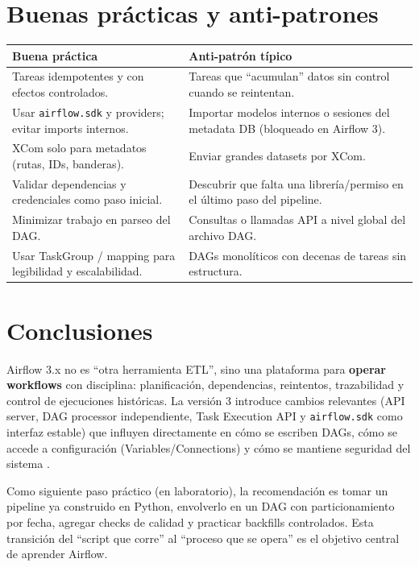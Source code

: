 \section{Buenas prácticas y anti-patrones}
\begin{longtable}{p{}p{}}
\toprule
\textbf{Buena práctica} & \textbf{Anti-patrón típico}\\
\midrule
\endhead
Tareas idempotentes y con efectos controlados. & Tareas que ``acumulan'' datos sin control cuando se reintentan.\\
Usar \texttt{airflow.sdk} y providers; evitar imports internos. & Importar modelos internos o sesiones del metadata DB (bloqueado en Airflow 3).\\
XCom solo para metadatos (rutas, IDs, banderas). & Enviar grandes datasets por XCom.\\
Validar dependencias y credenciales como paso inicial. & Descubrir que falta una librería/permiso en el último paso del pipeline.\\
Minimizar trabajo en parseo del DAG. & Consultas o llamadas API a nivel global del archivo DAG.\\
Usar TaskGroup / mapping para legibilidad y escalabilidad. & DAGs monolíticos con decenas de tareas sin estructura.\\
\bottomrule
\end{longtable}

\section{Conclusiones}
Airflow 3.x no es ``otra herramienta ETL'', sino una plataforma para \textbf{operar workflows} con disciplina: planificación, dependencias, reintentos, trazabilidad y control de ejecuciones históricas. La versión 3 introduce cambios relevantes (API server, DAG processor independiente, Task Execution API y \texttt{airflow.sdk} como interfaz estable) que influyen directamente en cómo se escriben DAGs, cómo se accede a configuración (Variables/Connections) y cómo se mantiene seguridad del sistema \cite{airflow_release_notes_3,airflow_upgrading_3_stable,airflow_public_interface}.

Como siguiente paso práctico (en laboratorio), la recomendación es tomar un pipeline ya construido en Python, envolverlo en un DAG con particionamiento por fecha, agregar checks de calidad y practicar backfills controlados. Esta transición del ``script que corre'' al ``proceso que se opera'' es el objetivo central de aprender Airflow.

\newpage
\printbibliography

